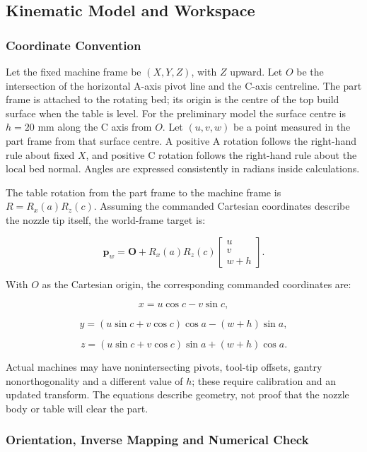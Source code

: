 \documentclass[12pt,a4paper]{article}
\begin{document}
\subsection{Kinematic Model and Workspace}\label{kinematic-model-and-workspace}

\subsubsection{Coordinate Convention}\label{coordinate-convention}

Let the fixed machine frame be \((X,Y,Z)\), with \(Z\) upward. Let \(O\) be the intersection of the
  horizontal A-axis pivot line and the C-axis centreline. The part frame is attached to the rotating bed;
  its origin is the centre of the top build surface when the table is level. For the preliminary model
  the surface centre is \(h=20\) mm along the C axis from \(O\). Let \((u,v,w)\) be a point measured in
  the part frame from that surface centre. A positive A rotation follows the right-hand rule about fixed
  \(X\), and positive C rotation follows the right-hand rule about the local bed normal. Angles are
  expressed consistently in radians inside calculations.

The table rotation from the part frame to the machine frame is \(R=R_x(a)R_z(c)\). Assuming the commanded
  Cartesian coordinates describe the nozzle tip itself, the world-frame target is:

\[
\mathbf{p}_w = \mathbf{O} + R_x(a)R_z(c)
\begin{bmatrix}u\\v\\w+h\end{bmatrix}.
\]

With \(O\) as the Cartesian origin, the corresponding commanded coordinates are:

\[
x=u\cos c-v\sin c,
\]

\[
y=(u\sin c+v\cos c)\cos a-(w+h)\sin a,
\]

\[
z=(u\sin c+v\cos c)\sin a+(w+h)\cos a.
\]

Actual machines may have nonintersecting pivots, tool-tip offsets, gantry nonorthogonality and a
  different value of \(h\); these require calibration and an updated transform. The equations describe
  geometry, not proof that the nozzle body or table will clear the part.

\subsubsection{Orientation, Inverse Mapping and Numerical
  Check}\label{orientation-inverse-mapping-and-numerical-check}
\end{document}
